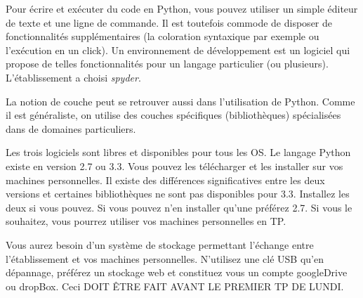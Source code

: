 Pour écrire et exécuter du code en Python, vous pouvez utiliser un simple éditeur de texte et une ligne de commande. Il est toutefois commode de disposer de fonctionnalités supplémentaires (la coloration syntaxique par exemple ou l'exécution en un click). Un environnement de développement est un logiciel qui propose de telles fonctionnalités pour un langage particulier (ou plusieurs). L'établissement a choisi \emph{spyder}.

La notion de couche peut se retrouver aussi dans l'utilisation de Python. Comme il est généraliste, on utilise des couches spécifiques (bibliothèques) spécialisées dans de domaines particuliers.

Les trois logiciels sont libres et disponibles pour tous les OS. Le langage Python existe en version 2.7 ou 3.3. Vous pouvez les télécharger et les installer sur vos machines personnelles. Il existe des différences significatives entre les deux versions et certaines bibliothèques ne sont pas disponibles pour 3.3. Installez les deux si vous pouvez. Si vous pouvez n'en installer qu'une préférez 2.7.  Si vous le souhaitez, vous pourrez utiliser vos machines personnelles en TP.

Vous aurez besoin d'un système de stockage permettant l'échange entre l'établissement et vos machines personnelles. N'utilisez une clé USB qu'en dépannage, préférez un stockage web et constituez vous un compte googleDrive ou dropBox. Ceci DOIT \^ETRE FAIT AVANT LE PREMIER TP DE LUNDI.

